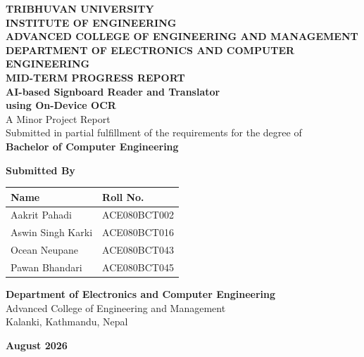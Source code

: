 \documentclass[12pt,a4paper]{report}
\begin{document}

\begin{titlepage}

\begin{center}

\vspace*{0.5cm}

{\Large \textbf{TRIBHUVAN UNIVERSITY}}\\[0.2cm]

{\large \textbf{INSTITUTE OF ENGINEERING}}\\[0.2cm]

{\large \textbf{ADVANCED COLLEGE OF ENGINEERING AND MANAGEMENT}}\\[0.2cm]

{\large \textbf{DEPARTMENT OF ELECTRONICS AND COMPUTER ENGINEERING}}\\[1.5cm]

{\Large \textbf{MID-TERM PROGRESS REPORT}}\\[0.8cm]

{\LARGE \textbf{AI-based Signboard Reader and Translator}}\\[0.4cm]

{\large \textbf{using On-Device OCR}}\\[1cm]

A Minor Project Report\\[0.3cm]

Submitted in partial fulfillment of the requirements for the degree of\\[0.3cm]

\textbf{Bachelor of Computer Engineering}

\vspace{1.2cm}

\textbf{Submitted By}

\vspace{0.4cm}

\begin{tabular}{|p{7cm}|p{4cm}|}
\hline
\textbf{Name} & \textbf{Roll No.} \\ \hline
Aakrit Pahadi & ACE080BCT002 \\ \hline
Aswin Singh Karki & ACE080BCT016 \\ \hline
Ocean Neupane & ACE080BCT043 \\ \hline
Pawan Bhandari & ACE080BCT045 \\ \hline
\end{tabular}

\vfill

\textbf{Department of Electronics and Computer Engineering}\\
Advanced College of Engineering and Management\\
Kalanki, Kathmandu, Nepal

\vspace{0.5cm}

\textbf{August 2026}

\end{center}

\end{titlepage}
\end{document}
